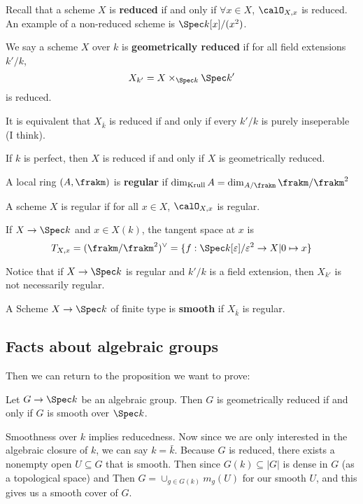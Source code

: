 \documentclass[12pt]{article}
\begin{document}
Recall that a scheme $X$ is \textbf{reduced} if and only if $\forall x\in X$, $\calO_{X,x}$ is reduced. An example of a non-reduced 
scheme is $\Spec k[x]/(x^2)$.
\begin{defn}
	We say a scheme $X$ over $k$ is \textbf{geometrically reduced} if for all field extensions $k'/k$,
	\[X_{k'}=X\times_{\Spec k}\Spec k'\]
	is reduced.
\end{defn}
\begin{rmk}
	It is equivalent that $X_{\bar k}$ is reduced if and only if every $k'/k$ is purely inseperable (I think).
\end{rmk}
\begin{rmk}
	If $k$ is perfect, then $X$ is reduced if and only if $X$ is geometrically reduced.
\end{rmk}
\begin{defn}
	A local ring $(A,\frakm)$ is \textbf{regular} if $\dim _{\text{Krull}}A=\dim_{A/\frakm} \frakm/\frakm^2$
\end{defn}
\begin{defn}
	A scheme $X$ is regular if for all $x\in X$, $\calO_{X,x}$ is regular.
\end{defn}
\begin{rmk}
	If $X\to \Spec k$ and $x\in X(k)$, the tangent space at $x$ is 
	\[T_{X,x}=(\frakm/\frakm^2)^\vee=\{f:\Spec k[\varepsilon]/\varepsilon^2\to X|0\mapsto x\}\]
\end{rmk}
\begin{rmk}
	Notice that if $X\to \Spec k$ is regular and $k'/k$ is a field extension, then $X_{k'}$ is not necessarily regular.
\end{rmk}

\begin{defn} 
	A Scheme $X\to \Spec k$ of finite type is \textbf{smooth} if $X_{\bar k}$ is regular.
\end{defn}

\subsection{Facts about algebraic groups}
Then we can return to the proposition we want to prove:
\begin{prop}
	Let $G\to \Spec k$ be an algebraic group. Then $G$ is geometrically reduced if and only if $G$ is smooth over $\Spec k$.
\end{prop}
\begin{prf}
	Smoothness over $k$ implies reducedness. Now since we are only interested in the algebraic closure of $k$, we can say $k=\bar k$. Because $G$ 
	is reduced, there exists a nonempty open $U\subseteq G$ that is smooth. Then since $G(k)\subseteq |G|$ is dense in $G$ (as a topological space) 
	and Then $G=\cup_{g\in G(k)}m_g(U)$ for our smooth $U$, and this gives us a smooth cover of $G$.
\end{prf}
\end{document}
